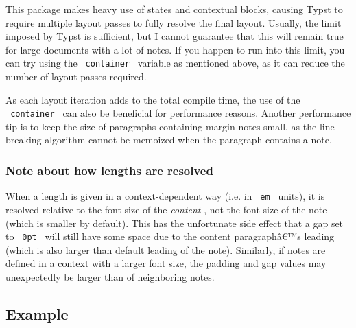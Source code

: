 This package makes heavy use of states and contextual blocks, causing
Typst to require multiple layout passes to fully resolve the final
layout. Usually, the limit imposed by Typst is sufficient, but I cannot
guarantee that this will remain true for large documents with a lot of
notes. If you happen to run into this limit, you can try using the
\texttt{\ container\ } variable as mentioned above, as it can reduce the
number of layout passes required.

As each layout iteration adds to the total compile time, the use of the
\texttt{\ container\ } can also be beneficial for performance reasons.
Another performance tip is to keep the size of paragraphs containing
margin notes small, as the line breaking algorithm cannot be memoized
when the paragraph contains a note.

\subsubsection{Note about how lengths are
resolved}\label{note-about-how-lengths-are-resolved}

When a length is given in a context-dependent way (i.e. in
\texttt{\ em\ } units), it is resolved relative to the font size of the
\emph{content} , not the font size of the note (which is smaller by
default). This has the unfortunate side effect that a gap set to
\texttt{\ 0pt\ } will still have some space due to the content
paragraphâ€™s leading (which is also larger than default leading of the
note). Similarly, if notes are defined in a context with a larger font
size, the padding and gap values may unexpectedly be larger than of
neighboring notes.

\subsection{Example}\label{example}

\begin{Shaded}
\begin{Highlighting}[]



\NormalTok{\#sidenote[The show holds the record for the most episodes of any}
\NormalTok{American sitcom.]. The show features the Simpson family: Homer,}

\NormalTok{is the intelligent and talented daughter \#sidenote[Lisa is known}
\NormalTok{for her saxophone playing and academic achievements.]. Baby}
\end{Highlighting}
\end{Shaded}

